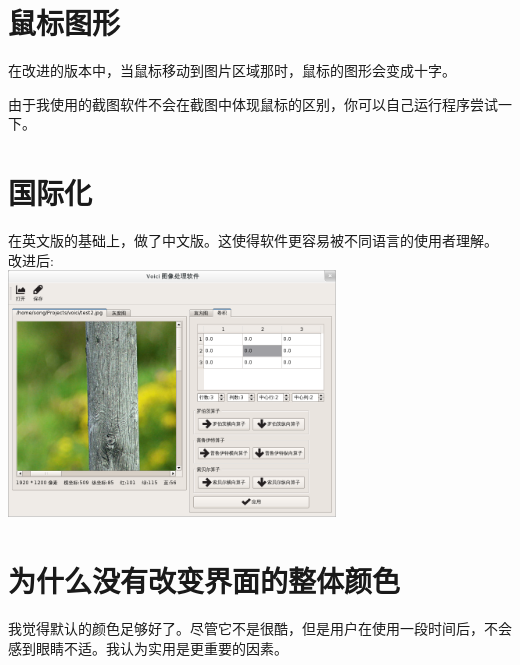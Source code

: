\documentclass[10pt,a4paper]{article}
\begin{document}
\pagebreak

\section{鼠标图形}
在改进的版本中，当鼠标移动到图片区域那时，鼠标的图形会变成十字。

由于我使用的截图软件不会在截图中体现鼠标的区别，你可以自己运行程序尝试一下。

\section{国际化}
在英文版的基础上，做了中文版。这使得软件更容易被不同语言的使用者理解。\\

改进后:\\
\indent\includegraphics[width=0.65\textwidth]{chinese_improved.png}

\section{为什么没有改变界面的整体颜色}
我觉得默认的颜色足够好了。尽管它不是很酷，但是用户在使用一段时间后，不会感到眼睛不适。我认为实用是更重要的因素。
\end{document}
